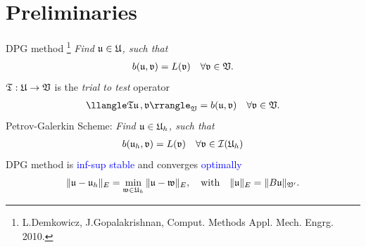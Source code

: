 \documentclass[10pt]{beamer}
\begin{document}
\section{Preliminaries}
\begin{frame}[t]{DPG method \footnote[1]{L.Demkowicz, J.Gopalakrishnan, Comput. Methods Appl. Mech. Engrg. 2010. }}
\emph{Find $\mathfrak{u} \in \mathfrak{U}$, such that}
    \begin{align*}
        b(\mathfrak{u},\mathfrak{v}) = L(\mathfrak{v})  \quad \forall \mathfrak{v} \in \mathfrak{V}.
    \end{align*}
${\mathfrak{T}}:\mathfrak{U} \to \mathfrak{V}$ is the \emph{trial to test} operator 
\begin{align*}
    \ip{\ttt\uu}{\vv}_{\VV} = b(\uu,\vv) \quad \forall \vv \in \VV.
\end{align*}    
Petrov-Galerkin Scheme:
\emph{Find $\mathfrak{u} \in \mathfrak{U}_h$, such that}
\begin{align*}
    b(\mathfrak{u}_h,\mathfrak{v}) = L(\mathfrak{v}) \quad \forall \mathfrak{v} \in \mathcal{I}(\mathfrak{U}_h) 
\end{align*}
DPG method is \textcolor{blue}{inf-sup stable} and converges \textcolor{blue}{optimally}
\begin{align*}
    \|\mathfrak{u}-\mathfrak{u}_h\|_{E} = \min_{\mathfrak{w} \in \mathfrak{U}_h} \|\mathfrak{u}-\mathfrak{w}\|_{E}, \quad \text{with} \quad \|\mathfrak{u}\|_{E} = \|B \mathfrak{u}\|_{\mathfrak{V}'}. 
\end{align*}
\end{frame}
\end{document}
